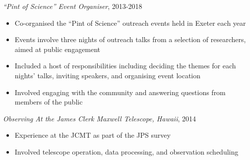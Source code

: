 \documentclass[letter, margin, 10pt]{res} %
\begin{document}
\begin{resume}
\vspace{-10pt}

{\sl ``Pint of Science'' Event Organiser}, 2013-2018
\begin{itemize}[noitemsep,topsep=0pt,parsep=0pt,partopsep=0pt]
\item Co-organised the ``Pint of Science'' outreach events held in Exeter each year
\item Events involve three nights of outreach talks from a selection of researchers, aimed at public engagement
\item Included a host of responsibilities including deciding the themes for each nights' talks, inviting speakers, and organising event location
\item Involved engaging with the community and answering questions from members of the public
\end{itemize}

\vspace{-10pt}

{\sl Observing At the James Clerk Maxwell Telescope, Hawaii}, 2014
\begin{itemize}[noitemsep,topsep=0pt,parsep=0pt,partopsep=0pt]
\item Experience at the JCMT as part of the JPS survey
\item Involved telescope operation, data processing, and observation scheduling
\end{itemize}

 





 

\end{resume}
\end{document}
